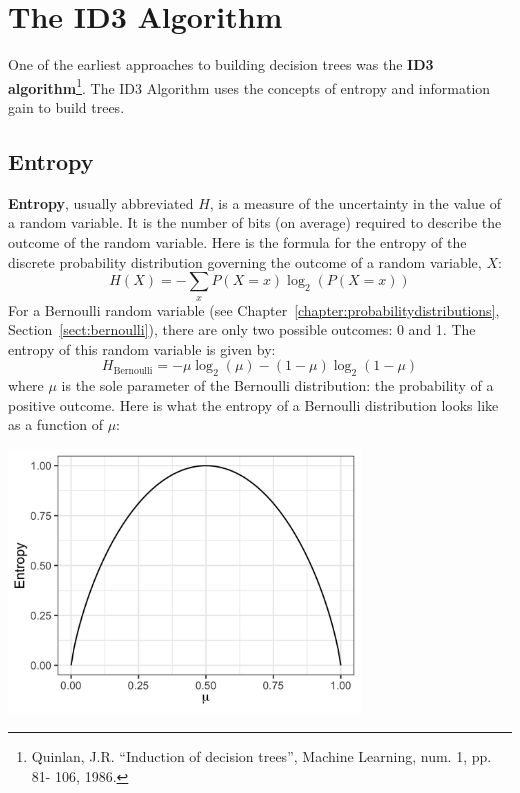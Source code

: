 
\section{The ID3 Algorithm}

One of the earliest approaches to building decision trees was the \textbf{ID3 algorithm}\footnote{Quinlan, J.R. ``Induction of decision trees'', Machine Learning, num. 1, pp. 81-
106, 1986.}. The ID3 Algorithm uses the concepts of entropy and information gain to build trees.

\subsection{Entropy}

\textbf{Entropy}, usually abbreviated $H$, is a measure of the uncertainty in the value of a random variable. It is the number of bits (on average) required to describe the outcome of the random variable. Here is the formula for the entropy of the discrete probability distribution governing the outcome of a random variable, $X$:
$$ H(X) = - \sum_{x} P(X = x) \log_2\left(P(X = x)\right) $$
For a Bernoulli random variable (see Chapter~\ref{chapter:probabilitydistributions}, Section~\ref{sect:bernoulli}), there are only two possible outcomes: 0 and 1. The entropy of this random variable is given by:
$$ H_\text{Bernoulli} = -\mu \log_2(\mu) - (1 - \mu) \log_2 (1 - \mu) $$
where $\mu$ is the sole parameter of the Bernoulli distribution: the probability of a positive outcome. Here is what the entropy of a Bernoulli distribution looks like as a function of $\mu$:
\begin{center}
\includegraphics[width=0.7\textwidth]{img/entropy-bernoulli.png}
\end{center}

